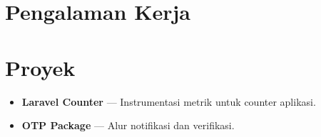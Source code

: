 \documentclass[11pt,a4paper]{article}
\begin{document}

\section*{Pengalaman Kerja}

\section*{Proyek}
\begin{itemize}
  \item \textbf{Laravel Counter} --- Instrumentasi metrik untuk counter aplikasi.
  \item \textbf{OTP Package} --- Alur notifikasi dan verifikasi.
\end{itemize}

\end{document}
